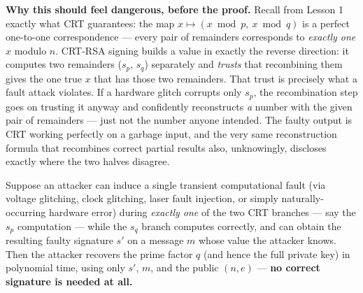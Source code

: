 \medskip\noindent\textbf{Why this should feel dangerous, before the proof.} Recall from Lesson 1 exactly what CRT guarantees: the map $x\mapsto(x\bmod p,\ x\bmod q)$ is a perfect one-to-one correspondence — every pair of remainders corresponds to \emph{exactly one} $x$ modulo $n$. CRT-RSA signing builds a value in exactly the reverse direction: it computes two remainders ($s_p$, $s_q$) separately and \emph{trusts} that recombining them gives the one true $x$ that has those two remainders. That trust is precisely what a fault attack violates. If a hardware glitch corrupts only $s_p$, the recombination step goes on trusting it anyway and confidently reconstructs \emph{a} number with the given pair of remainders — just not the number anyone intended. The faulty output is CRT working perfectly on a garbage input, and the very same reconstruction formula that recombines correct partial results also, unknowingly, discloses exactly where the two halves disagree.

\begin{theorem}
Suppose an attacker can induce a single transient computational fault (via voltage glitching, clock glitching, laser fault injection, or simply naturally-occurring hardware error) during \emph{exactly one} of the two CRT branches — say the $s_p$ computation — while the $s_q$ branch computes correctly, and can obtain the resulting faulty signature $s'$ on a message $m$ whose value the attacker knows. Then the attacker recovers the prime factor $q$ (and hence the full private key) in polynomial time, using only $s'$, $m$, and the public $(n,e)$ — \textbf{no correct signature is needed at all.}
\end{theorem}

